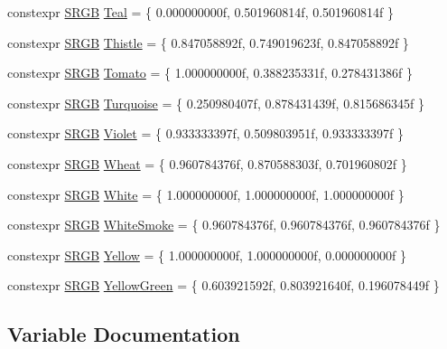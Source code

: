 \begin{DoxyCompactItemize}
constexpr \hyperlink{structmage_1_1_s_r_g_b}{S\+R\+GB} \hyperlink{namespacemage_1_1color_a7d93fefcc1c3842f233a444b2a047b31}{Teal} = \{ 0.\+000000000f, 0.\+501960814f, 0.\+501960814f \}
\item 
constexpr \hyperlink{structmage_1_1_s_r_g_b}{S\+R\+GB} \hyperlink{namespacemage_1_1color_a16c371f14ad3400c401638bbb965650b}{Thistle} = \{ 0.\+847058892f, 0.\+749019623f, 0.\+847058892f \}
\item 
constexpr \hyperlink{structmage_1_1_s_r_g_b}{S\+R\+GB} \hyperlink{namespacemage_1_1color_ace48831c9fff78216d1c88f110da1bdb}{Tomato} = \{ 1.\+000000000f, 0.\+388235331f, 0.\+278431386f \}
\item 
constexpr \hyperlink{structmage_1_1_s_r_g_b}{S\+R\+GB} \hyperlink{namespacemage_1_1color_a1871b6f0150c91c020319337119e72c9}{Turquoise} = \{ 0.\+250980407f, 0.\+878431439f, 0.\+815686345f \}
\item 
constexpr \hyperlink{structmage_1_1_s_r_g_b}{S\+R\+GB} \hyperlink{namespacemage_1_1color_a10b518f831070a50ba51e663fbde1223}{Violet} = \{ 0.\+933333397f, 0.\+509803951f, 0.\+933333397f \}
\item 
constexpr \hyperlink{structmage_1_1_s_r_g_b}{S\+R\+GB} \hyperlink{namespacemage_1_1color_ae381a3be6093d5c39d6e9304bea95b8c}{Wheat} = \{ 0.\+960784376f, 0.\+870588303f, 0.\+701960802f \}
\item 
constexpr \hyperlink{structmage_1_1_s_r_g_b}{S\+R\+GB} \hyperlink{namespacemage_1_1color_aecd3f854835fd8ac76f38a369ea539ed}{White} = \{ 1.\+000000000f, 1.\+000000000f, 1.\+000000000f \}
\item 
constexpr \hyperlink{structmage_1_1_s_r_g_b}{S\+R\+GB} \hyperlink{namespacemage_1_1color_ae04903c7f3c3579b0c66775e29dd41fe}{White\+Smoke} = \{ 0.\+960784376f, 0.\+960784376f, 0.\+960784376f \}
\item 
constexpr \hyperlink{structmage_1_1_s_r_g_b}{S\+R\+GB} \hyperlink{namespacemage_1_1color_af44fd30e339165ca6ac5ce01cef3050f}{Yellow} = \{ 1.\+000000000f, 1.\+000000000f, 0.\+000000000f \}
\item 
constexpr \hyperlink{structmage_1_1_s_r_g_b}{S\+R\+GB} \hyperlink{namespacemage_1_1color_a5267fc3edf483b5524ce1b5faccf81aa}{Yellow\+Green} = \{ 0.\+603921592f, 0.\+803921640f, 0.\+196078449f \}
\end{DoxyCompactItemize}


\subsection{Variable Documentation}
\hypertarget{namespacemage_1_1color_a2d5ef85e2e43ff7fb45cef27d4997b3b}{}\label{namespacemage_1_1color_a2d5ef85e2e43ff7fb45cef27d4997b3b} 
